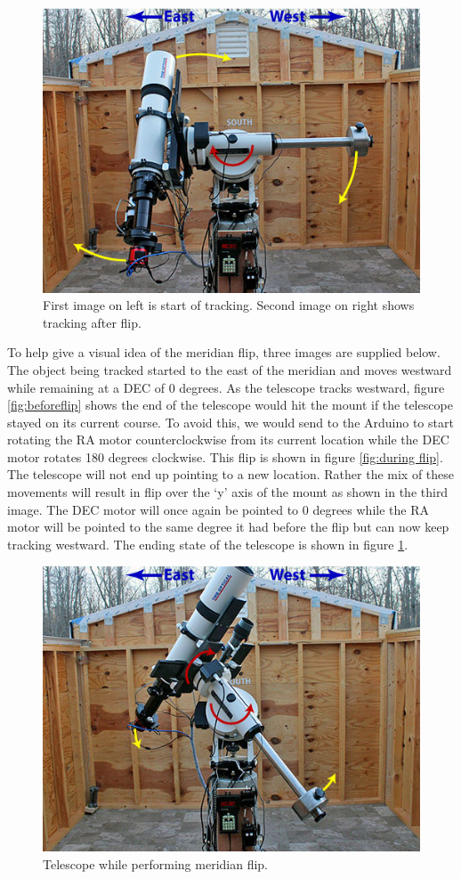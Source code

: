 \documentclass[12pt]{report}
\begin{document}
\begin{enumerate}
\begin{figure}[h]
  \centering
  \includegraphics[width=0.6\linewidth]{afterflip}
   \caption{First image on left is start of tracking. Second image on right shows tracking after flip.}
   \label{fig:afterflip}
\end{figure}

To help give a visual idea of the meridian flip, three images are supplied below. The object being tracked started to the east of the meridian and moves westward while remaining at a DEC of 0 degrees. As the telescope tracks westward, figure \ref{fig:beforeflip} shows the end of the telescope would hit the mount if the telescope stayed on its current course. To avoid this, we would send to the Arduino to start rotating the RA motor counterclockwise from its current location while the DEC motor rotates 180 degrees clockwise. This flip is shown in figure \ref{fig:during flip}. The telescope will not end up pointing to a new location. Rather the mix of these movements will result in flip over the ‘y’ axis of the mount as shown in the third image. The DEC motor will once again be pointed to 0 degrees while the RA motor will be pointed to the same degree it had before the flip but can now keep tracking westward. The ending state of the telescope is shown in figure \ref{fig:afterflip}.

\begin{figure}[h]
  \centering
  \includegraphics[width=0.6\linewidth]{duringflip}
  \caption{Telescope while performing meridian flip.}
  \label{fig:duringflip}
\end{figure}


\end{enumerate}
\end{document}
